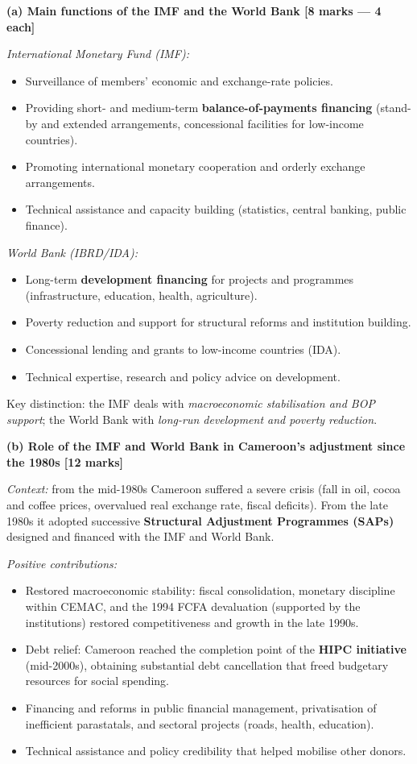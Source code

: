 \documentclass[11pt]{article}
\begin{document}
\begin{corrige}
\textbf{(a) Main functions of the IMF and the World Bank [8 marks — 4 each]}

\emph{International Monetary Fund (IMF):}
\begin{itemize}
\item Surveillance of members' economic and exchange-rate policies.
\item Providing short- and medium-term \textbf{balance-of-payments financing} (stand-by and extended arrangements, concessional facilities for low-income countries).
\item Promoting international monetary cooperation and orderly exchange arrangements.
\item Technical assistance and capacity building (statistics, central banking, public finance).
\end{itemize}

\emph{World Bank (IBRD/IDA):}
\begin{itemize}
\item Long-term \textbf{development financing} for projects and programmes (infrastructure, education, health, agriculture).
\item Poverty reduction and support for structural reforms and institution building.
\item Concessional lending and grants to low-income countries (IDA).
\item Technical expertise, research and policy advice on development.
\end{itemize}
Key distinction: the IMF deals with \emph{macroeconomic stabilisation and BOP support}; the World Bank with \emph{long-run development and poverty reduction}.

\textbf{(b) Role of the IMF and World Bank in Cameroon's adjustment since the 1980s [12 marks]}

\emph{Context:} from the mid-1980s Cameroon suffered a severe crisis (fall in oil, cocoa and coffee prices, overvalued real exchange rate, fiscal deficits). From the late 1980s it adopted successive \textbf{Structural Adjustment Programmes (SAPs)} designed and financed with the IMF and World Bank.

\emph{Positive contributions:}
\begin{itemize}
\item Restored macroeconomic stability: fiscal consolidation, monetary discipline within CEMAC, and the 1994 FCFA devaluation (supported by the institutions) restored competitiveness and growth in the late 1990s.
\item Debt relief: Cameroon reached the completion point of the \textbf{HIPC initiative} (mid-2000s), obtaining substantial debt cancellation that freed budgetary resources for social spending.
\item Financing and reforms in public financial management, privatisation of inefficient parastatals, and sectoral projects (roads, health, education).
\item Technical assistance and policy credibility that helped mobilise other donors.
\end{itemize}


\end{corrige}
\end{document}
